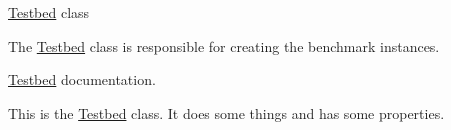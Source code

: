 \mbox{\hyperlink{classTestbed}{Testbed}} class

The \mbox{\hyperlink{classTestbed}{Testbed}} class is responsible for creating the benchmark instances.

\mbox{\hyperlink{classTestbed}{Testbed}} documentation.

This is the \mbox{\hyperlink{classTestbed}{Testbed}} class. It does some things and has some properties. 